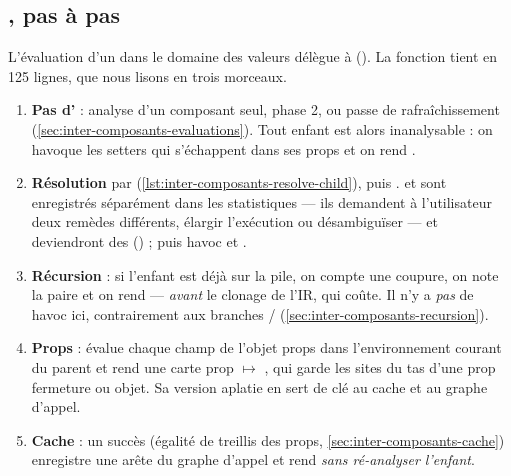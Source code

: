 \subsection{, pas à pas}

L'évaluation d'un  dans le domaine des valeurs délègue à
 (). La fonction tient
en 125 lignes, que nous lisons en trois morceaux.


\begin{enumerate}
  \item \textbf{Pas d'} : analyse d'un composant seul, phase 2, ou passe de
        rafraîchissement (\cref{sec:inter-composants-evaluations}). Tout enfant est alors
        inanalysable : on havoque les setters qui s'échappent dans ses props et on rend
        .
  \item \textbf{Résolution} par 
        (\cref{lst:inter-composants-resolve-child}), puis .  et
         sont enregistrés séparément dans les statistiques --- ils demandent à
        l'utilisateur deux remèdes différents, élargir l'exécution ou désambiguïser --- et
        deviendront des \Info{} 
        () ; puis havoc et .
\end{enumerate}


\begin{enumerate}\setcounter{enumi}{2}
  \item \textbf{Récursion} : si l'enfant est déjà sur la pile, on compte une coupure, on note
        la paire  et on rend  --- \emph{avant} le clonage
        de l'IR, qui coûte. Il n'y a \emph{pas} de havoc ici, contrairement aux branches
        / (\cref{sec:inter-composants-recursion}).
  \item \textbf{Props} :  évalue chaque champ de l'objet props dans
        l'environnement courant du parent et rend une carte prop $\mapsto$ , qui
        garde les sites du tas d'une prop fermeture ou objet. Sa version aplatie en
         sert de clé au cache et au graphe d'appel.
  \item \textbf{Cache} : un succès (égalité de treillis des props,
        \cref{sec:inter-composants-cache}) enregistre une arête du graphe d'appel et rend
         \emph{sans ré-analyser l'enfant}.
\end{enumerate}

